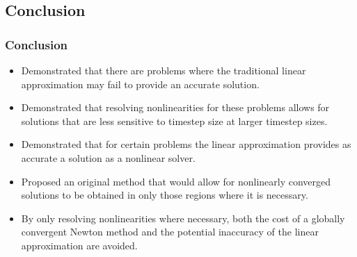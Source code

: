 \documentclass[compress,xcolor=table]{beamer}
\begin{document}
\subsection[Conclusion]{Conclusion}
\begin{frame}
\frametitle{Conclusion}

\begin{itemize}
\item{Demonstrated that there are problems where the traditional linear approximation may fail to provide an accurate solution.}
\item{Demonstrated that resolving nonlinearities for these problems allows for solutions that are less sensitive to timestep size at larger timestep sizes.}
\item{Demonstrated that for certain problems the linear approximation provides as accurate a solution as a nonlinear solver.}
\item{Proposed an original method that would allow for nonlinearly converged solutions to be obtained in only those regions where it is necessary.}
\item{By only resolving nonlinearities where necessary, both the cost of a globally convergent Newton method and the potential inaccuracy of the linear approximation are avoided.}
\end{itemize}

\end{frame}
\end{document}
